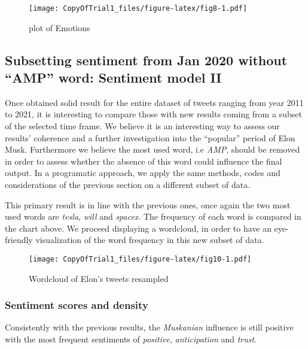 \documentclass[
]{article}
\begin{document}
\begin{figure}
\centering
\texttt{[image: CopyOfTrial1\_files/figure-latex/fig8-1.pdf]}
\caption{\label{fig:fig8}plot of Emotions}
\end{figure}

\hypertarget{subsetting-sentiment-from-jan-2020-without-amp-word-sentiment-model-ii}{%
\subsection{Subsetting sentiment from Jan 2020 without ``AMP'' word:
Sentiment model
II}\label{subsetting-sentiment-from-jan-2020-without-amp-word-sentiment-model-ii}}

Once obtained solid result for the entire dataset of tweets ranging from
year 2011 to 2021, it is interesting to compare those with new results
coming from a subset of the selected time frame. We believe it is an
interesting way to assess our results' coherence and a further
investigation into the ``popular'' period of Elon Musk. Furthermore we
believe the most used word, i.e \emph{AMP}, should be removed in order
to assess whether the absence of this word could influence the final
output. In a programatic approach, we apply the same methods, codes and
considerations of the previous section on a different subset of data.

This primary result is in line with the previous ones, once again the
two most used words are \emph{tesla}, \emph{will} and \emph{spacex}. The
frequency of each word is compared in the chart above. We proceed
displaying a wordcloud, in order to have an eye-friendly visualization
of the word frequency in this new subset of data.

\begin{figure}
\centering
\texttt{[image: CopyOfTrial1\_files/figure-latex/fig10-1.pdf]}
\caption{\label{fig:fig10}Wordcloud of Elon's tweets resampled}
\end{figure}

\hypertarget{sentiment-scores-and-density-1}{%
\subsubsection{Sentiment scores and
density}\label{sentiment-scores-and-density-1}}

Consistently with the previous results, the \emph{Muskanian} influence
is still positive with the most frequent sentiments of \emph{positive},
\emph{anticipation} and \emph{trust}.
\end{document}
